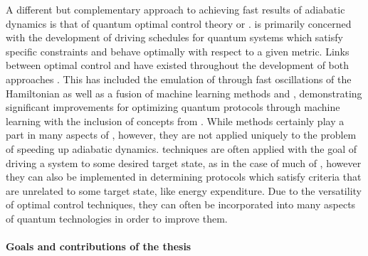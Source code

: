 A different but complementary approach to achieving fast results of adiabatic dynamics is that of quantum optimal control theory or  \cite{glaser_training_2015, koch_quantum_2022}.  is primarily concerned with the development of driving schedules for quantum systems which satisfy specific constraints and behave optimally with respect to a given metric. Links between optimal control and  have existed throughout the development of both approaches \cite{stefanatos_frictionless_2010, stefanatos_shortcut_2021, zhang_connection_2021}. This has included the emulation of  through fast oscillations of the Hamiltonian \cite{petiziol_accelerated_2020, petiziol_fast_2018} as well as a fusion of machine learning methods and , demonstrating significant improvements for
optimizing quantum protocols through machine learning with the inclusion of concepts from  \cite{bukov_reinforcement_2018, yao_reinforcement_2021, khait_optimal_2022}. While  methods certainly play a part in many aspects of , however, they are not applied uniquely to the problem of speeding up adiabatic dynamics.  techniques are often applied with the goal of driving a system to some desired target state, as in the case of much of , however they can also be implemented in determining protocols which satisfy criteria that are unrelated to some target state, like energy expenditure. Due to the versatility of optimal control techniques, they can often be incorporated into many aspects of quantum technologies in order to improve them.


\paragraph*{Goals and contributions of the thesis}

